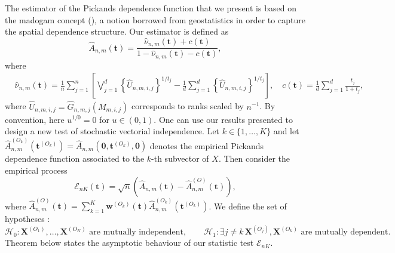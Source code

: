 \documentclass[11pt]{article}
\theoremstyle{definition}
\begin{document}
	The estimator of the Pickands dependence function that we present is based on the madogam concept (\cite{cooley2006variograms, MARCON20171}), a notion borrowed from geostatistics in order to capture the spatial dependence structure. Our estimator is defined as 
	\begin{equation}
		\hat{A}_{n,m}(\textbf{t}) = \frac{\hat{\nu}_{n,m}(\textbf{t}) + c(\textbf{t})}{1-\hat{\nu}_{n,m}(\textbf{t})-c(\textbf{t})},
	\end{equation}
	where
	\begin{align*}
		& \hat{\nu}_{n,m}(\textbf{t}) = \frac{1}{n} \sum_{j=1}^n \left[\bigvee_{j=1}^d \left\{ \hat{U}_{n,m,i,j} \right\}^{1/t_j} - \frac{1}{d} \sum_{j=1}^d \left\{ \hat{U}_{n,m,i,j} \right\}^{1/t_j} \right], \quad c(\textbf{t}) = \frac{1}{d} \sum_{j=1}^d \frac{t_j}{1+t_j},
	\end{align*}
	where $\hat{U}_{n,m,i,j} = \hat{G}_{n,m,j}(M_{m,i,j})$ corresponds to ranks scaled by $n^{-1}$. By convention, here $u^{1/0} = 0$ for $u \in (0,1)$. One can use our results presented to design a new test of stochastic vectorial independence. Let $k\in\{1,\dots,K\}$ and let $\hat{A}_{n,m}^{(O_k)}(\textbf{t}^{(O_k)}) = \hat{A}_{n,m}(\textbf{0},\textbf{t}^{(O_k)}, \textbf{0})$ denotes the empirical Pickands dependence function associated to the $k$-th subvector of $X$. Then consider the empirical process
	\begin{equation}
		\mathcal{E}_{nK} (\textbf{t}) = \sqrt{n}\left(\hat{A}_{n,m}(\textbf{t}) - \hat{A}^{(O)}_{n,m}(\textbf{t}) \right),
	\end{equation}
	where $\hat{A}_{n,m}^{(O)}(\textbf{t}) = \sum_{k=1}^K \textbf{w}^{(O_k)}(\textbf{t}) \hat{A}_{n,m}^{(O_k)}(\textbf{t}^{(O_k)})$. We define the set of hypotheses :
	\begin{equation*}
		\mathcal{H}_0 : \textbf{X}^{(O_1)}, \dots, \textbf{X}^{(O_K)} \textrm{ are mutually independent}, \quad \quad \mathcal{H}_1 : \exists j \neq k \, \textbf{X}^{(O_j)}, \textbf{X}^{(O_k)} \textrm{ are mutually dependent}.
	\end{equation*}
	Theorem below states the asymptotic behaviour of our statistic test $\mathcal{E}_{nK}$.
\end{document}
